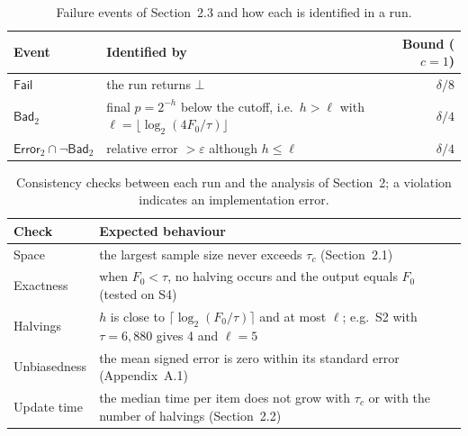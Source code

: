 \documentclass[11pt]{article}
\newcommand{\eps}{\varepsilon}
\newcommand{\Err}{\mathsf{Error}}
\begin{document}
\begin{table}[htbp]
\centering\small
\caption{Failure events of Section~2.3 and how each is identified in a
run.}\label{tab:events}
\begin{tabularx}{\linewidth}{@{}lLr@{}}
\toprule
Event & Identified by & Bound ($c = 1$) \\
\midrule
$\mathsf{Fail}$ & the run returns $\bot$ & $\delta/8$ \\
$\mathsf{Bad}_2$ & final $p = 2^{-h}$ below the cutoff, i.e.\ $h > \ell$ with
  $\ell = \lfloor \log_2(4F_0/\tau) \rfloor$ & $\delta/4$ \\
$\Err_2 \cap \neg\mathsf{Bad}_2$ & relative error $> \eps$ although
  $h \le \ell$ & $\delta/4$ \\
\bottomrule
\end{tabularx}
\end{table}

\begin{table}[htbp]
\centering\small
\caption{Consistency checks between each run and the analysis of Section~2;
a violation indicates an implementation error.}\label{tab:checks}
\begin{tabularx}{\linewidth}{@{}p{2.8cm}L@{}}
\toprule
Check & Expected behaviour \\
\midrule
Space & the largest sample size never exceeds $\tau_c$ (Section~2.1) \\
Exactness & when $F_0 < \tau$, no halving occurs and the output equals $F_0$
  (tested on S4) \\
Halvings & $h$ is close to $\lceil \log_2(F_0/\tau) \rceil$ and at most
  $\ell$; e.g.\ S2 with $\tau = 6{,}880$ gives 4 and $\ell = 5$ \\
Unbiasedness & the mean signed error is zero within its standard error
  (Appendix~A.1) \\
Update time & the median time per item does not grow with $\tau_c$ or with
  the number of halvings (Section~2.2) \\
\bottomrule
\end{tabularx}
\end{table}
\end{document}
